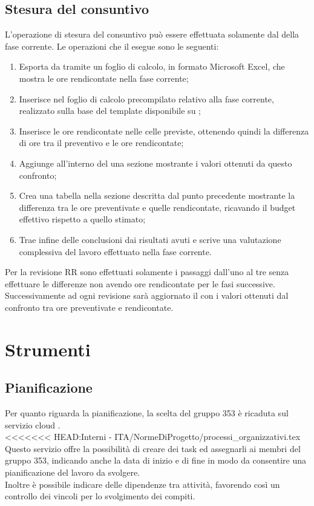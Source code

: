 \documentclass[NormeDiProgetto.tex]{subfiles}
\begin{document}
	\subsection{Stesura del consuntivo}
	L'operazione di stesura del consuntivo può essere effettuata solamente dal \respdiprog{} della fase corrente.
	Le operazioni che il \respdiprog{} esegue sono le seguenti:
	\begin{enumerate}
		\item Esporta da  tramite  un foglio di calcolo, in formato Microsoft Excel, che mostra le ore rendicontate nella fase corrente;
		\item Inserisce nel foglio di calcolo precompilato relativo alla fase corrente, realizzato sulla base del template disponibile su ;
		\item Inserisce le ore rendicontate nelle celle previste, ottenendo quindi la differenza di ore tra il preventivo e le ore rendicontate;
		\item Aggiunge all'interno del \pdp{} una sezione mostrante i valori ottenuti da questo confronto;
		\item Crea una tabella nella sezione descritta dal punto precedente mostrante la differenza tra le ore preventivate e quelle rendicontate, ricavando il budget effettivo rispetto a quello stimato;
		\item Trae infine delle conclusioni dai risultati avuti e scrive una valutazione complessiva del lavoro effettuato nella fase corrente.
	\end{enumerate}
	Per la revisione RR sono effettuati solamente i passaggi dall'uno al tre senza effettuare le differenze non avendo ore rendicontate per le fasi successive. Successivamente ad ogni revisione sarà aggiornato il \pdp{} con i valori ottenuti dal confronto tra ore preventivate e rendicontate. 
	
	\section{Strumenti}	
	\subsection{Pianificazione} Per quanto riguarda la pianificazione, la scelta del gruppo 353 è ricaduta sul servizio cloud .\\
<<<<<<< HEAD:Interni - ITA/NormeDiProgetto/processi_organizzativi.tex
	Questo servizio offre la possibilità di creare dei task ed assegnarli ai membri del gruppo 353, indicando anche la data di inizio e di fine in modo da consentire una pianificazione del lavoro da svolgere.\\
	Inoltre è possibile indicare delle dipendenze tra attività, favorendo così un controllo dei vincoli per lo svolgimento dei compiti.\\
	
\end{document}
